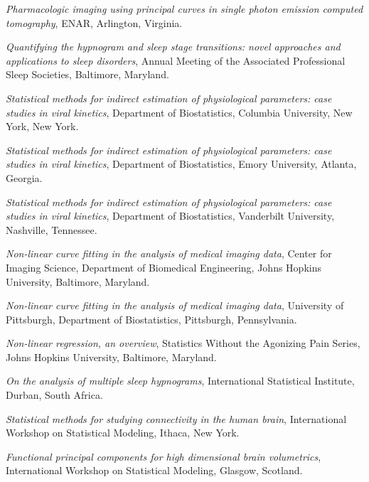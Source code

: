 \documentclass[12pt]{article}
\begin{document}
\begin{description}
\begin{description}
        \item {\it Pharmacologic imaging using principal curves in single photon emission computed tomography}, ENAR, Arlington, Virginia.
        \item {\it Quantifying the hypnogram and sleep stage transitions: novel approaches and applications to sleep disorders}, Annual Meeting of the Associated Professional Sleep Societies, Baltimore, Maryland.
        \item {\it Statistical methods for indirect estimation of physiological parameters: case studies in viral kinetics}, Department of Biostatistics, Columbia University, New York, New York.
        \item {\it Statistical methods for indirect estimation of physiological parameters: case studies in viral kinetics}, Department of Biostatistics, Emory University, Atlanta, Georgia.
        \item {\it Statistical methods for indirect estimation of physiological parameters: case studies in viral kinetics}, Department of Biostatistics, Vanderbilt University, Nashville, Tennessee.
    \end{description}
    \item[\textnormal{2009}]
    \begin{description}
        \item {\it Non-linear curve fitting in the analysis of medical imaging data}, Center for Imaging Science, Department of Biomedical Engineering, Johns Hopkins University, Baltimore, Maryland.
  \item {\it Non-linear curve fitting in the analysis of medical
      imaging data}, University of Pittsburgh, Department of
    Biostatistics, Pittsburgh, Pennsylvania.
  \item {\it Non-linear regression, an overview}, Statistics Without
    the Agonizing Pain Series, Johns Hopkins University, Baltimore,
    Maryland.
    \item {\it On the analysis of multiple sleep hypnograms},
      International Statistical Institute, Durban, South Africa.
    \item {\it Statistical methods for studying connectivity in the
        human brain}, International Workshop on Statistical Modeling,
      Ithaca, New York.
    \end{description}
\item[\textnormal{2010}]
  \begin{description}
	\item {\it Functional principal components for high dimensional brain volumetrics}, International Workshop on Statistical Modeling, Glasgow, Scotland.

\end{description}
\end{description}
\end{document}
